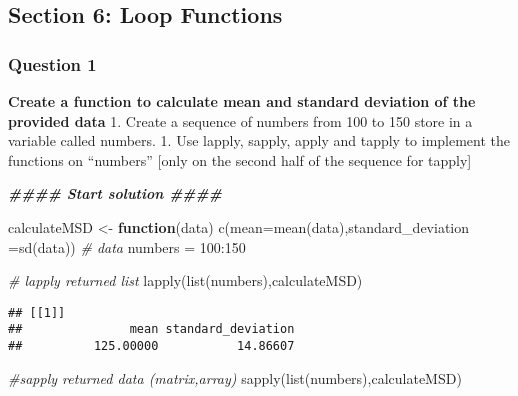 \documentclass[
]{article}
\newenvironment{Shaded}{\begin{snugshade}}{\end{snugshade}}
\newcommand{\AttributeTok}[1]{\textcolor[rgb]{0.77,0.63,0.00}{#1}}
\newcommand{\CommentTok}[1]{\textcolor[rgb]{0.56,0.35,0.01}{\textit{#1}}}
\newcommand{\ControlFlowTok}[1]{\textcolor[rgb]{0.13,0.29,0.53}{\textbf{#1}}}
\newcommand{\DecValTok}[1]{\textcolor[rgb]{0.00,0.00,0.81}{#1}}
\newcommand{\DocumentationTok}[1]{\textcolor[rgb]{0.56,0.35,0.01}{\textbf{\textit{#1}}}}
\newcommand{\FunctionTok}[1]{\textcolor[rgb]{0.00,0.00,0.00}{#1}}
\newcommand{\NormalTok}[1]{#1}
\newcommand{\OtherTok}[1]{\textcolor[rgb]{0.56,0.35,0.01}{#1}}
\newcommand{\SpecialCharTok}[1]{\textcolor[rgb]{0.00,0.00,0.00}{#1}}
\begin{document}
\hypertarget{section-6-loop-functions}{%
\subsection{Section 6: Loop Functions}\label{section-6-loop-functions}}

\hypertarget{question-1-5}{%
\subsubsection{Question 1}\label{question-1-5}}

\textbf{Create a function to calculate mean and standard deviation of
the provided data} 1. Create a sequence of numbers from 100 to 150 store
in a variable called numbers. 1. Use lapply, sapply, apply and tapply to
implement the functions on ``numbers'' {[}only on the second half of the
sequence for tapply{]}

\begin{Shaded}
\begin{Highlighting}[]
\DocumentationTok{\#\#\#\# Start solution \#\#\#\#}
\end{Highlighting}
\end{Shaded}

\begin{Shaded}
\begin{Highlighting}[]
\NormalTok{calculateMSD }\OtherTok{\textless{}{-}} \ControlFlowTok{function}\NormalTok{(data) }\FunctionTok{c}\NormalTok{(}\AttributeTok{mean=}\FunctionTok{mean}\NormalTok{(data),}\AttributeTok{standard\_deviation =}\FunctionTok{sd}\NormalTok{(data))}
\CommentTok{\# data}
\NormalTok{numbers }\OtherTok{=} \DecValTok{100}\SpecialCharTok{:}\DecValTok{150}

\CommentTok{\# lapply returned list}
\FunctionTok{lapply}\NormalTok{(}\FunctionTok{list}\NormalTok{(numbers),calculateMSD)}
\end{Highlighting}
\end{Shaded}

\begin{verbatim}
## [[1]]
##               mean standard_deviation 
##          125.00000           14.86607
\end{verbatim}

\begin{Shaded}
\begin{Highlighting}[]
\CommentTok{\#sapply returned data (matrix,array)}
\FunctionTok{sapply}\NormalTok{(}\FunctionTok{list}\NormalTok{(numbers),calculateMSD)}
\end{Highlighting}
\end{Shaded}
\end{document}
